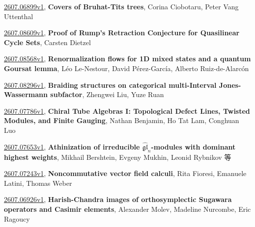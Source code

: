 \documentclass[9pt, a4paper]{article}
\theoremstyle{plain}
\theoremstyle{definition}
\theoremstyle{remark}
\newcommand{\arxiv}[3]{\href{https://arxiv.org/abs/#1}{#1}, \textbf{\textcolor{arxivblue}{#2}}, #3}
\begin{document}
\arxiv{2607.06899v1}{Covers of Bruhat-Tits trees}{Corina Ciobotaru, Peter Vang Uttenthal}

\arxiv{2607.08609v1}{Proof of Rump's Retraction Conjecture for Quasilinear Cycle Sets}{Carsten Dietzel}

\arxiv{2607.08568v1}{Renormalization flows for 1D mixed states and a quantum Goursat lemma}{Léo Le-Nestour, David Pérez-García, Alberto Ruiz-de-Alarcón}

\arxiv{2607.08296v1}{Braiding structures on categorical multi-Interval Jones-Wassermann subfactor}{Zhengwei Liu, Yuze Ruan}

\arxiv{2607.07786v1}{Chiral Tube Algebras I: Topological Defect Lines, Twisted Modules, and Finite Gauging}{Nathan Benjamin, Ho Tat Lam, Conghuan Luo}

\arxiv{2607.07653v1}{Athinization of irreducible $\widehat{\mathfrak{gl}}_n$-modules with dominant highest weights}{Mikhail Bershtein, Evgeny Mukhin, Leonid Rybnikov 等}

\arxiv{2607.07243v1}{Noncommutative vector field calculi}{Rita Fioresi, Emanuele Latini, Thomas Weber}

\arxiv{2607.06926v1}{Harish-Chandra images of orthosymplectic Sugawara operators and Casimir elements}{Alexander Molev, Madeline Nurcombe, Eric Ragoucy}

\end{document}
